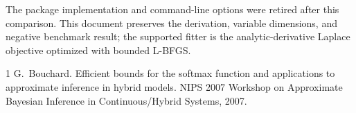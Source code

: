 \documentclass[11pt]{article}
\begin{document}
The package implementation and command-line options were retired after this comparison. This document preserves the derivation, variable dimensions, and negative benchmark result; the supported fitter is the analytic-derivative Laplace objective optimized with bounded L-BFGS.

\begin{thebibliography}{1}
G.~Bouchard.
\newblock Efficient bounds for the softmax function and applications to approximate inference in hybrid models.
\newblock NIPS 2007 Workshop on Approximate Bayesian Inference in Continuous/Hybrid Systems, 2007.
\end{thebibliography}
\end{document}

